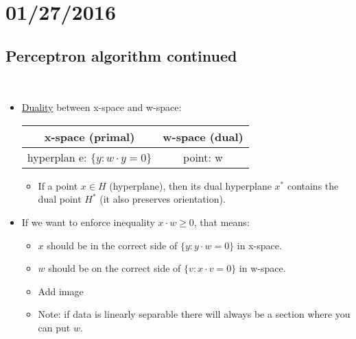 \documentclass[10pt]{article}
\begin{document}
\section*{01/27/2016}
	\subsection*{Perceptron algorithm continued}
	\
		\begin{itemize}
			\item \underline{Duality} between x-space and w-space:\\
				\begin{center}
					\begin{tabular}{ c|c}
  						x-space (primal) & w-space (dual) \\
  						\hline
  						hyperplan	e: $\{y: w \cdot y = 0\}$ & point: w \\
  						\hline
					\end{tabular}
				\end{center}
				\begin{itemize}
					\item If a point $x \in H$ (hyperplane), then its dual hyperplane $x^{*}$ contains the dual point $H^{*}$ (it also preserves orientation).
				\end{itemize}
			
			\item If we want to enforce inequality $x \cdot w \geq 0$, that means:
				\begin{itemize}
					\item $x$ should be in the correct side of $\{y: y \cdot w = 0\}$ in x-space.
					\item $w$ should be on the correct side of $\{v: x \cdot v = 0\}$ in w-space.
					\item Add image
					\item Note: if data is linearly separable there will always be a section where you can put $w$.
				\end{itemize}
		\end{itemize}
\end{document}
